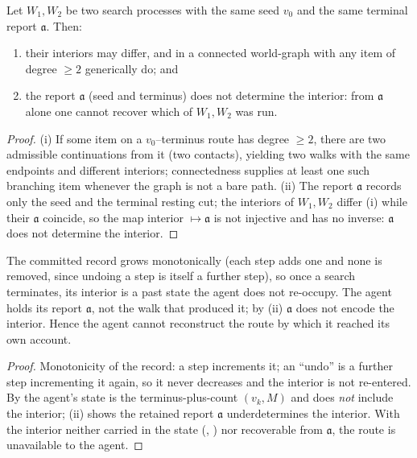 \documentclass[11pt,twocolumn,a4paper]{article}
\newcommand{\Walk}{W}
\newcommand{\rec}{M}
\newcommand{\acct}{\mathfrak{a}}   %
\begin{document}
\begin{theorem}
\label{thm:opacity}
Let $\Walk_1,\Walk_2$ be two search processes with the same seed $v_0$ and
the same terminal report $\acct$. Then:
\begin{enumerate}[label=\textup{(\roman*)},leftmargin=2.2em]
\item their interiors may differ, and in a connected world-graph with any
item of degree $\ge2$ generically do; and
\item the report $\acct$ (seed and terminus) does not determine the
interior: from $\acct$ alone one cannot recover which of $\Walk_1,\Walk_2$
was run.
\end{enumerate}
\end{theorem}

\begin{proof}
(i) If some item on a $v_0$--terminus route has degree $\ge2$, there are two
admissible continuations from it (two contacts), yielding two walks with the
same endpoints and different interiors; connectedness supplies at least one
such branching item whenever the graph is not a bare path. (ii) The report
$\acct$ records only the seed and the terminal resting cut; the interiors of
$\Walk_1,\Walk_2$ differ (i) while their $\acct$ coincide, so the map
interior $\mapsto\acct$ is not injective and has no inverse: $\acct$ does
not determine the interior.
\end{proof}

\begin{corollary}
\label{cor:noreconstruct}
The committed record grows monotonically (each step adds one and none is
removed, since undoing a step is itself a further step), so once a search
terminates, its interior is a past state the agent does not re-occupy. The
agent holds its report $\acct$, not the walk that produced it; by
(ii) $\acct$ does not encode the interior. Hence the agent
cannot reconstruct the route by which it reached its own account.
\end{corollary}

\begin{proof}
Monotonicity of the record: a step increments it; an ``undo'' is a further
step incrementing it again, so it never decreases and the interior is not
re-entered. By  the agent's state is the
terminus-plus-count $(v_k,\rec)$ and does \emph{not} include the interior;
(ii) shows the retained report $\acct$ underdetermines the
interior. With the interior neither carried in the state (,
) nor recoverable from $\acct$, the route is
unavailable to the agent.
\end{proof}
\end{document}
